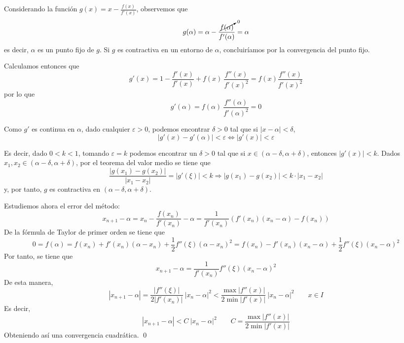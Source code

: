     \begin{dem}
        Considerando la función $g(x)=x-\frac{f(x)}{f'(x)}$, observemos que $$g(\alpha)=\alpha-\dfrac{\cancelto{0}{f(\alpha)}}{f'(\alpha)}=\alpha$$es decir, $\alpha$ es un punto fijo de $g$. Si $g$ es contractiva en un entorno de $\alpha$, concluiríamos por la convergencia del punto fijo.

        Calculamos entonces que
        $$g'(x)=1- \dfrac{f'(x)}{f'(x)}+f(x) \: \dfrac{f''(x)}{f'(x)^2}=f(x)\dfrac{f''(x)}{f'(x)^2}$$
        por lo que $$g'(\alpha)=f(\alpha) \: \dfrac{f''(\alpha)}{f'(\alpha)^2}=0$$
        
        Como $g'$ es continua en $\alpha$, dado cualquier $\varepsilon > 0$, podemos encontrar $\delta > 0$ tal que si $|x-\alpha| < \delta$, $$|g'(x)-g'(\alpha)|< \varepsilon \iff |g'(x)|< \varepsilon$$

        Es decir, dado $0 < k < 1$, tomando $\varepsilon=k$ podemos encontrar un $\delta > 0$ tal que si $x \in (\alpha- \delta, \alpha+\delta)$, entonces $|g'(x)| < k$. Dados $x_1,x_2\in(\alpha-\delta,\alpha+\delta)$, por el teorema del valor medio se tiene que
        $$\dfrac{|g(x_1)-g(x_2)|}{|x_1-x_2|}=|g'(\xi)|<k\Rightarrow |g(x_1)-g(x_2)|<k\cdot |x_1-x_2|$$
        y, por tanto, $g$ es contractiva en $(\alpha- \delta, \alpha+\delta)$.
        
        Estudiemos ahora el error del método:
    $$x_{n+1}-\alpha=x_n-\dfrac{f(x_n)}{f'(x_n)} - \alpha=\dfrac{1}{f'(x_n)}(f'(x_n)(x_n-\alpha)-f(x_n))$$
    De la fórmula de Taylor de primer orden se tiene que
    $$0=f(\alpha)=f(x_n)+f'(x_n)(\alpha-x_n)+\dfrac{1}{2}f''(\xi)(\alpha-x_n)^2=f(x_n)-f'(x_n)(x_n-\alpha)+\dfrac{1}{2}f''(\xi)(x_n-\alpha)^2$$
    Por tanto, se tiene que 
    $$x_{n+1}-\alpha=\dfrac{1}{f'(x_n)}f''(\xi)(x_n-\alpha)^2$$
    De esta manera, $$|x_{n+1}-\alpha|=\dfrac{|f''(\xi)|}{2|f'(x_n)|}\: |x_n-\alpha|^2 < \dfrac{\max|f''(x)|}{2\min|f'(x)|}\: |x_n-\alpha|^2 \qquad x \in I$$
    Es decir,
    $$|x_{n+1}-\alpha|< C \: |x_n-\alpha|^2 \qquad C=\dfrac{\max|f''(x)|}{2\min|f'(x)|} $$
    Obteniendo así una convergencia cuadrática.
    \qed\end{dem}
